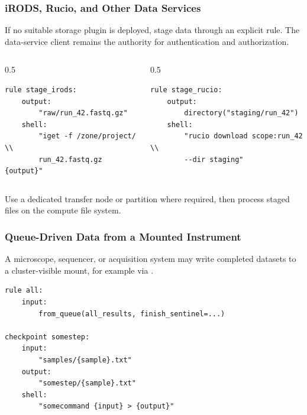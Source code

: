 \begin{frame}[fragile]
	\frametitle{iRODS, Rucio, and Other Data Services}
	If no suitable storage plugin is deployed, stage data through an explicit rule. The data-service client remains the authority for authentication and authorization.
	\begin{columns}[t]
		\begin{column}{0.5\textwidth}
			\begin{lstlisting}[language=Snakemake, style=Snakemake, basicstyle=\scriptsize]
rule stage_irods:
    output:
        "raw/run_42.fastq.gz"
    shell:
		"iget -f /zone/project/ \\
		run_42.fastq.gz {output}"
			\end{lstlisting}
		\end{column}
		\begin{column}{0.5\textwidth}
			\begin{lstlisting}[language=Snakemake, style=Snakemake, basicstyle=\scriptsize]
rule stage_rucio:
    output:
        directory("staging/run_42")
    shell:
		"rucio download scope:run_42 \\
		--dir staging"
			\end{lstlisting}
		\end{column}
	\end{columns}
	\begin{hint}
		Use a dedicated transfer node or partition where required, then process staged files on the compute file system.
	\end{hint}
\end{frame}

\begin{frame}[fragile]
	\frametitle{Queue-Driven Data from a Mounted Instrument}
	A microscope, sequencer, or acquisition system may write completed datasets to a cluster-visible mount, for example via .
	\begin{lstlisting}[language=Snakemake, style=Snakemake]
rule all:
    input:
        from_queue(all_results, finish_sentinel=...)

checkpoint somestep:
    input:
        "samples/{sample}.txt"
    output:
        "somestep/{sample}.txt"
    shell:
        "somecommand {input} > {output}"
	\end{lstlisting}
\end{frame}
